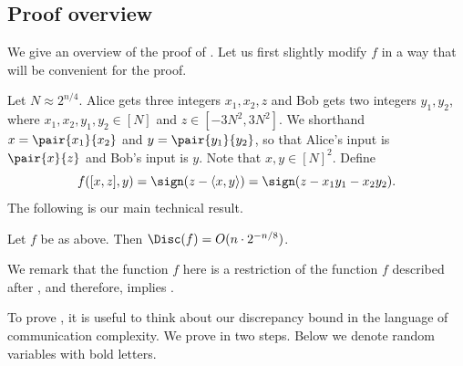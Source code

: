 \subsection{Proof overview}
%
We give an overview of the proof of .  %
Let us first slightly modify $f$ in a way that will be convenient for the proof.

Let $N \approx 2^{n/4}$. Alice gets three integers $x_1,x_2,z$ and Bob gets two integers $y_1,y_2$, where $x_1,x_2,y_1,y_2 \in [N]$ and $z \in [-3N^2, 3N^2]$. We shorthand $x=\pair{x_1}{x_2}$ and $y=\pair{y_1}{y_2}$, so that Alice's input is $\pair{x}{z}$ and Bob's input is $y$. Note that $x,y \in [N]^2$.
Define
$$
f([x,z],y) =\sign(z-\langle x,y \rangle) = \sign(z - x_1 y_1 - x_2 y_2).
$$
The following is our main technical result.
\begin{theorem}
\label{thm:disc}
Let $f$ be as above. Then $\Disc(f) = O(n \cdot 2^{-n/8})$.
\end{theorem}

We remark that the function $f$ here is a restriction of the function $f$ described after , and therefore,  implies .

To prove , it is useful to think about our discrepancy bound in the language of communication complexity. We prove  in two steps. Below we denote random variables with bold letters.

